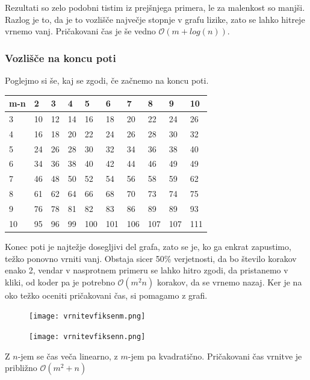 \documentclass[12pt,a4paper]{amsart}
\begin{document}
Rezultati so zelo podobni tistim iz prejšnjega primera, le za malenkost so manjši. Razlog je to, da je to vozlišče
največje stopnje v grafu lizike, zato se lahko hitreje vrnemo vanj.
Pričakovani čas je še vedno $\mathcal{O}(m+log(n))$.

\subsubsection{Vozlišče na koncu poti}

Poglejmo si še, kaj se zgodi, če začnemo na koncu poti.

\begin{table}[!ht]
    \centering
    \begin{tabular}{|l|l|l|l|l|l|l|l|l|l|}
    \hline
        m-n & 2 & 3 & 4 & 5 & 6 & 7 & 8 & 9 & 10 \\ \hline
        3 & 10 & 12 & 14 & 16 & 18 & 20 & 22 & 24 & 26 \\ \hline
        4 & 16 & 18 & 20 & 22 & 24 & 26 & 28 & 30 & 32 \\ \hline
        5 & 24 & 26 & 28 & 30 & 32 & 34 & 36 & 38 & 40 \\ \hline
        6 & 34 & 36 & 38 & 40 & 42 & 44 & 46 & 49 & 49 \\ \hline
        7 & 46 & 48 & 50 & 52 & 54 & 56 & 58 & 59 & 62 \\ \hline
        8 & 61 & 62 & 64 & 66 & 68 & 70 & 73 & 74 & 75 \\ \hline
        9 & 76 & 78 & 81 & 82 & 83 & 86 & 89 & 89 & 93 \\ \hline
        10 & 95 & 96 & 99 & 100 & 101 & 106 & 107 & 107 & 111 \\ \hline
    \end{tabular}
\end{table}

Konec poti je najtežje dosegljivi del grafa, zato se je, ko ga enkrat zapustimo, težko ponovno vrniti vanj. Obstaja
sicer 50\% verjetnosti, da bo število korakov enako 2, vendar v nasprotnem primeru se lahko hitro zgodi, da pristanemo
v kliki, od koder pa je potrebno $\mathcal{O}(m^2n)$ korakov, da se vrnemo nazaj.
Ker je na oko težko oceniti pričakovani čas, si pomagamo z grafi.

\begin{figure}[h]
    \texttt{[image: vrnitevfiksenm.png]}
\end{figure}

\begin{figure}[h]
    \texttt{[image: vrnitevfiksenn.png]}
\end{figure}

Z $n$-jem se čas veča linearno, z $m$-jem pa kvadratično. Pričakovani čas vrnitve je približno $\mathcal{O}(m^2+n)$
\end{document}
